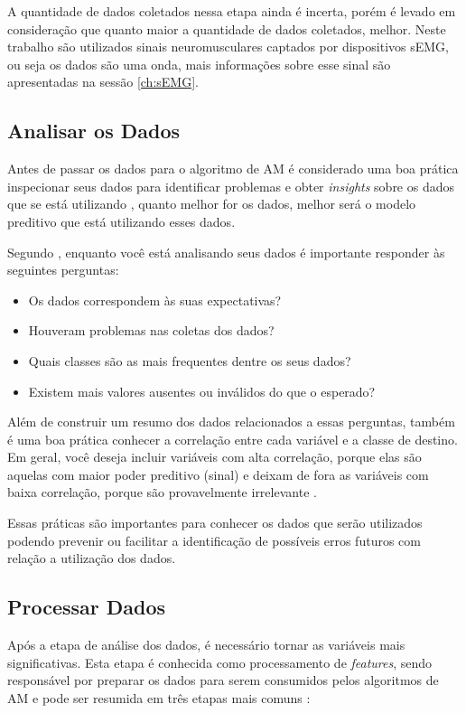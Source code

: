 A quantidade de dados coletados nessa etapa ainda é incerta, porém é levado em consideração que quanto maior a quantidade de dados coletados, melhor. Neste trabalho são utilizados sinais neuromusculares captados por dispositivos sEMG, ou seja os dados são uma onda, mais informações sobre esse sinal são apresentadas na sessão \ref{ch:sEMG}.

\subsection{Analisar os Dados}

Antes de passar os dados para o algoritmo de AM é considerado uma boa prática inspecionar seus dados para identificar problemas e obter \textit{insights} sobre os dados que se está utilizando \cite{Amazon}, quanto melhor for os dados, melhor será o modelo preditivo que está utilizando esses dados.

Segundo , enquanto você está analisando seus dados é importante responder às seguintes perguntas:
\begin{itemize}
	\item Os dados correspondem às suas expectativas?
	\item Houveram problemas nas coletas dos dados?
	\item Quais classes são as mais frequentes dentre os seus dados?
	\item Existem mais valores ausentes ou inválidos do que o esperado?
\end{itemize}

Além de construir um resumo dos dados relacionados a essas perguntas, também é uma boa prática conhecer a correlação entre cada variável e a classe de destino. Em geral, você deseja incluir variáveis com alta correlação, porque elas são aquelas com maior poder preditivo (sinal) e deixam de fora as variáveis com baixa correlação, porque são provavelmente irrelevante \cite{Amazon}.

Essas práticas são importantes para conhecer os dados que serão utilizados podendo prevenir ou facilitar a identificação de possíveis erros futuros com relação a utilização dos dados.

\subsection{Processar Dados}

Após a etapa de análise dos dados, é necessário tornar as variáveis mais significativas. Esta etapa é conhecida como processamento de \textit{features}, sendo responsável por preparar os dados para serem consumidos pelos algoritmos de AM e pode ser resumida em três etapas mais comuns \cite{blum1997selection}:

